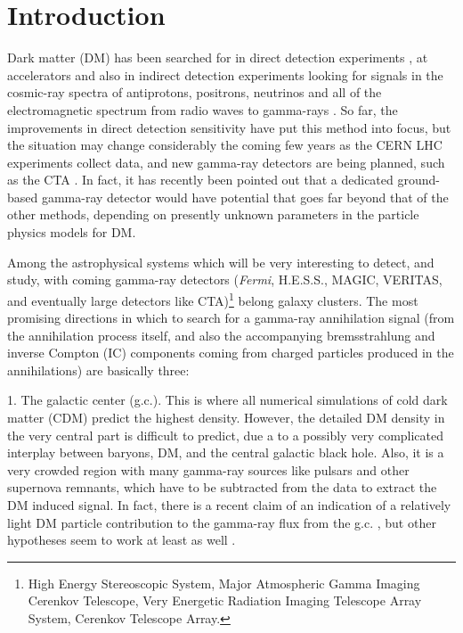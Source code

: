 \documentclass[10pt,aps,pra,reprint,amsmath,amsfonts,amssymb,showpacs,nofootinbib,floatfix]{revtex4-1}
\newcommand{\Fermi}{{\em Fermi}\xspace}
\begin{document}
\maketitle
\section{Introduction}

Dark matter (DM) has been searched for in direct detection experiments
\cite{Pato:2010zk}, at accelerators
\cite{Ellis:2001hv,Baer:2006ff,Khachatryan:2011tk} and also in
indirect detection experiments looking for signals in the cosmic-ray
spectra of antiprotons, positrons, neutrinos and all of the
electromagnetic spectrum from radio waves to gamma-rays
\cite{Bergstrom:2009ib}. So far, the improvements in direct detection
sensitivity have put this method into focus, but the situation may
change considerably the coming few years as the CERN LHC experiments
collect data, and new gamma-ray detectors are being planned, such as
the CTA \cite{Consortium:2010bc}. In fact, it has recently been
pointed out \cite{Bergstrom:2010gh} that a dedicated ground-based
gamma-ray detector would have potential that goes far beyond that of
the other methods, depending on presently unknown parameters in the
particle physics models for DM.

Among the astrophysical systems which will be very interesting to detect, and
study, with coming gamma-ray detectors (\Fermi, H.E.S.S., MAGIC, VERITAS, and
eventually large detectors like CTA)\footnote{{High Energy Stereoscopic System,
    Major Atmospheric Gamma Imaging Cerenkov Telescope, Very Energetic Radiation
    Imaging Telescope Array System, Cerenkov Telescope Array.}} belong galaxy
clusters. The most promising directions in which to search for a gamma-ray
annihilation signal (from the annihilation process itself, and also the
accompanying bremsstrahlung and inverse Compton (IC) components coming from
charged particles produced in the annihilations) are basically three:

1. The galactic center (g.c.). This is where all numerical simulations
of cold dark matter (CDM) predict the highest density. However, the
detailed DM density in the very central part is difficult to predict,
due a to a possibly very complicated interplay between baryons, DM,
and the central galactic black hole. Also, it is a very crowded region
with many gamma-ray sources like pulsars and other supernova remnants,
which have to be subtracted from the data to extract the DM induced
signal. In fact, there is a recent claim of an indication of a
relatively light DM particle contribution to the gamma-ray flux from
the g.c. \cite{2010arXiv1010.2752H}, 
but other hypotheses seem to work
at least as well \cite{2010arXiv1012.5839B}.
\end{document}
